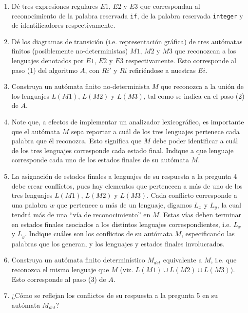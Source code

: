 \documentclass[letterpaper,10pt]{article}
\begin{document}
\begin{enumerate}
    \item Dé tres expresiones regulares $E1$, $E2$ y $E3$ que correspondan al reconocimiento de la palabra reservada \texttt{if}, de la palabra reservada \texttt{integer} y de identificadores respectivamente.
    
    \item Dé los diagramas de transición (i.e. representación gráfica) de tres autómatas finitos (posiblemente no-deterministas) $M1$, $M2$ y $M3$ que reconozcan a los lenguajes denotados por $E1$, $E2$ y $E3$ respectivamente. Esto corresponde al paso (1) del algoritmo $A$, con $Ri'$ y $Ri$ refiriéndose a nuestras $Ei$.
    
    \item Construya un autómata finito no-determinista $M$ que reconozca a la unión de los lenguajes $L(M1)$, $L(M2)$ y $L(M3)$, tal como se indica en el paso (2) de $A$.
    
    \item Note que, a efectos de implementar un analizador lexicográfico, es importante que el autómata $M$ sepa reportar a cuál de los tres lenguajes pertenece cada palabra que él reconozca. Esto significa que $M$ debe poder identificar a cuál de los tres lenguajes corresponde cada estado final. Indique a que lenguaje corresponde cada uno de los estados finales de su autómata $M$.
    
    \item La asignación de estados finales a lenguajes de su respuesta a la pregunta 4 debe crear conflictos, pues hay elementos que pertenecen a más de uno de los tres lenguajes $L(M1)$, $L(M2)$ y $L(M3)$. Cada conflicto corresponde a una palabra $w$ que pertenece a más de un lenguaje, digamos $L_x$ y $L_y$, la cual tendrá más de una ``vía de reconocimiento'' en $M$. Estas vías deben terminar en estados finales asociados a los distintos lenguajes correspondientes, i.e. $L_x$ y $L_y$. Indique cuáles son los conflictos de su autómata $M$, especificando las palabras que los generan, y los lenguajes y estados finales involucrados.
    
    \item Construya un autómata finito determinístico $M_{det}$ equivalente a $M$, i.e. que reconozca el mismo lenguaje que $M$ (viz. $L(M1) \cup L(M2) \cup L(M3)$). Esto corresponde al paso (3) de $A$.
    
    \item ¿Cómo se reflejan los conflictos de su respuesta a la pregunta 5 en su autómata $M_{det}$?
    

\end{enumerate}
\end{document}
